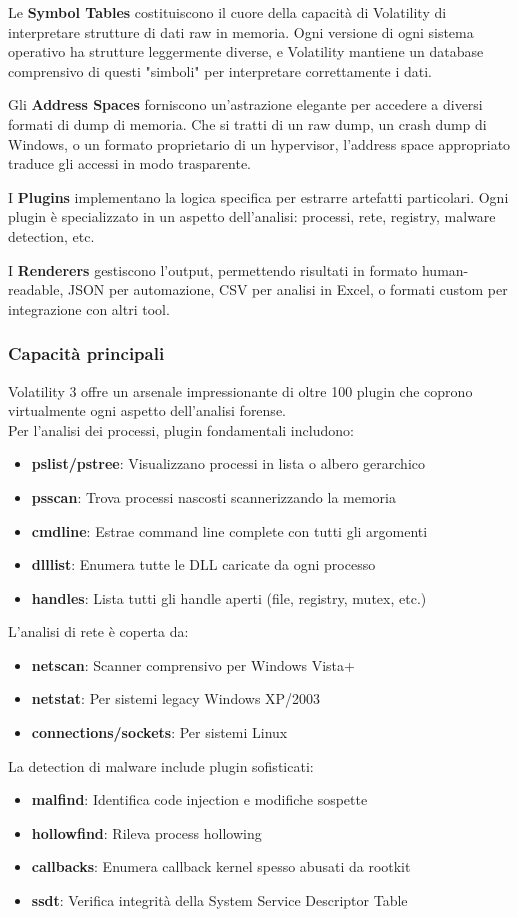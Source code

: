 Le \textbf{Symbol Tables} costituiscono il cuore della capacità di Volatility di interpretare strutture di dati raw in memoria. Ogni versione di ogni sistema operativo ha strutture leggermente diverse, e Volatility mantiene un database comprensivo di questi "simboli" per interpretare correttamente i dati.

Gli \textbf{Address Spaces} forniscono un'astrazione elegante per accedere a diversi formati di dump di memoria. Che si tratti di un raw dump, un crash dump di Windows, o un formato proprietario di un hypervisor, l'address space appropriato traduce gli accessi in modo trasparente.

I \textbf{Plugins} implementano la logica specifica per estrarre artefatti particolari. Ogni plugin è specializzato in un aspetto dell'analisi: processi, rete, registry, malware detection, etc.

I \textbf{Renderers} gestiscono l'output, permettendo risultati in formato human-readable, JSON per automazione, CSV per analisi in Excel, o formati custom per integrazione con altri tool.

\subsubsection{Capacità principali}
Volatility 3 offre un arsenale impressionante di oltre 100 plugin che coprono virtualmente ogni aspetto dell'analisi forense.\\
Per l'analisi dei processi, plugin fondamentali includono:
\begin{itemize}
    \item \textbf{pslist/pstree}: Visualizzano processi in lista o albero gerarchico
    \item \textbf{psscan}: Trova processi nascosti scannerizzando la memoria
    \item \textbf{cmdline}: Estrae command line complete con tutti gli argomenti
    \item \textbf{dlllist}: Enumera tutte le DLL caricate da ogni processo
    \item \textbf{handles}: Lista tutti gli handle aperti (file, registry, mutex, etc.)
\end{itemize}
L'analisi di rete è coperta da:
\begin{itemize}
    \item \textbf{netscan}: Scanner comprensivo per Windows Vista+
    \item \textbf{netstat}: Per sistemi legacy Windows XP/2003
    \item \textbf{connections/sockets}: Per sistemi Linux
\end{itemize}
La detection di malware include plugin sofisticati:
\begin{itemize}
    \item \textbf{malfind}: Identifica code injection e modifiche sospette
    \item \textbf{hollowfind}: Rileva process hollowing
    \item \textbf{callbacks}: Enumera callback kernel spesso abusati da rootkit
    \item \textbf{ssdt}: Verifica integrità della System Service Descriptor Table
\end{itemize}

